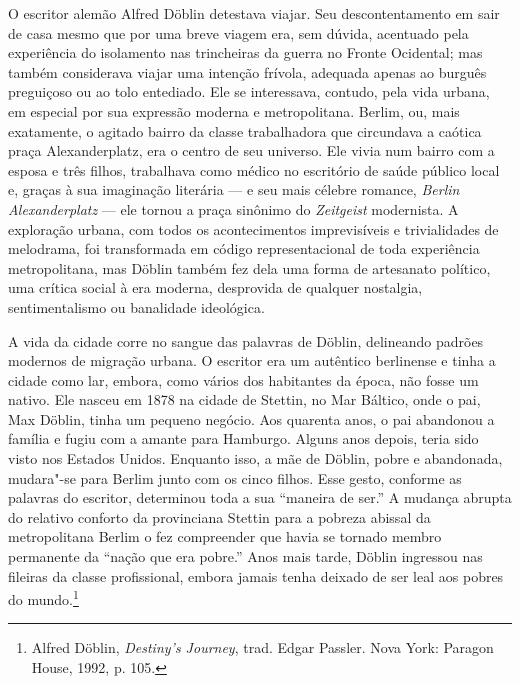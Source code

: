O escritor alemão Alfred Döblin detestava viajar. Seu descontentamento
em sair de casa mesmo que por uma breve viagem era, sem dúvida,
acentuado pela experiência do isolamento nas trincheiras da guerra no
Fronte Ocidental; mas também considerava viajar uma intenção frívola,
adequada apenas ao burguês preguiçoso ou ao tolo entediado. Ele se
interessava, contudo, pela vida urbana, em especial por sua expressão
moderna e metropolitana. Berlim, ou, mais exatamente, o agitado bairro
da classe trabalhadora que circundava a caótica praça Alexanderplatz,
era o centro de seu universo. Ele vivia num bairro com a esposa e três
filhos, trabalhava como médico no escritório de saúde público local e,
graças à sua imaginação literária --- e seu mais célebre romance,
\textit{Berlin Alexanderplatz} --- ele tornou a praça sinônimo do
\textit{Zeitgeist} modernista. A exploração urbana, com todos os
acontecimentos imprevisíveis e trivialidades de melodrama, foi
transformada em código representacional de toda experiência
metropolitana, mas Döblin também fez dela uma forma de artesanato
político, uma crítica social à era moderna, desprovida de qualquer
nostalgia, sentimentalismo ou banalidade ideológica.

A vida da cidade corre no sangue das palavras de Döblin, delineando
padrões modernos de migração urbana. O escritor era um autêntico
berlinense e tinha a cidade como lar, embora, como vários dos habitantes
da época, não fosse um nativo. Ele nasceu em 1878 na cidade de Stettin,
no Mar Báltico, onde o pai, Max Döblin, tinha um pequeno negócio. Aos
quarenta anos, o pai abandonou a família e fugiu com a amante para
Hamburgo. Alguns anos depois, teria sido visto nos Estados Unidos.
Enquanto isso, a mãe de Döblin, pobre e abandonada, mudara"-se para
Berlim junto com os cinco filhos. Esse gesto, conforme as palavras do
escritor, determinou toda a sua ``maneira de ser.'' A mudança abrupta do
relativo conforto da provinciana Stettin para a pobreza abissal da
metropolitana Berlim o fez compreender que havia se tornado membro
permanente da ``nação que era pobre.'' Anos mais tarde, Döblin ingressou
nas fileiras da classe profissional, embora jamais tenha deixado de ser
leal aos pobres do mundo.\footnote{Alfred Döblin, \textit{Destiny's Journey}, trad. Edgar Passler. Nova York: Paragon House, 1992, p. 105.}


